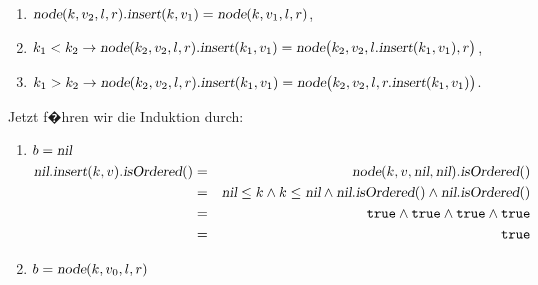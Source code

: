 \documentclass{article}
\begin{document}
\begin{enumerate}
\begin{enumerate}
      \item $\textsl{node}(k, v_2, l, r)\mathtt{.}\textsl{insert}(k,v_1) = \textsl{node}(k, v_1, l, r)$,
      \item $k_1 < k_2 \rightarrow 
             \textsl{node}(k_2, v_2, l, r)\mathtt{.}\textsl{insert}(k_1, v_1) =
             \textsl{node}\bigl(k_2, v_2, l\mathtt{.}\textsl{insert}(k_1, v_1), r\bigr)$,
      \item $k_1 > k_2 \rightarrow 
             \textsl{node}(k_2, v_2, l, r)\mathtt{.}\textsl{insert}(k_1, v_1) = 
             \textsl{node}\bigl(k_2, v_2, l, r\mathtt{.}\textsl{insert}(k_1, v_1)\bigr)$.
      \end{enumerate}
      Jetzt f�hren wir die Induktion durch:
      \begin{enumerate}
      \item $b = \textsl{nil}$
            \begin{eqnarray*}
                  \textsl{nil}.\textsl{insert}(k,v).\textsl{isOrdered}()
            & = & \textsl{node}(k,v,\textsl{nil},\textsl{nil}).\textsl{isOrdered}() \\
            & = & \textsl{nil} \leq k \wedge k \leq \textsl{nil} 
                  \wedge \textsl{nil}.\textsl{isOrdered}()\wedge \textsl{nil}.\textsl{isOrdered}() \\
            & = & \mathtt{true} \wedge \mathtt{true} \wedge \mathtt{true} \wedge \mathtt{true}  \\
            & = & \mathtt{true}
            \end{eqnarray*}
      \item $b = \textsl{node}(k,v_0,l,r)$


\end{enumerate}
\end{enumerate}
\end{document}
